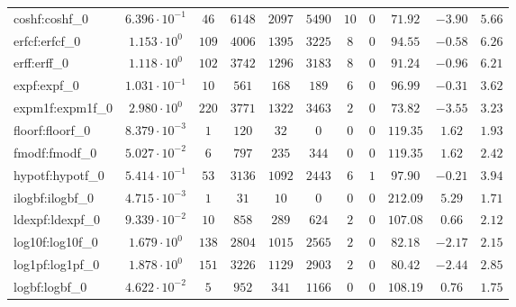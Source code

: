 \begin{tabular}{|l|c|c|c|c|c|c|c|c|c|c|}
coshf:coshf\_0               & $ 6.396 \cdot 10^{-1} $ & $ 46     $ & $ 6148   $ & $ 2097  $ & $ 5490  $ & $ 10  $ & $ 0 $ & $ 71.92       $ & $ -3.90   $ & $ 5.66    $ \\
erfcf:erfcf\_0               & $ 1.153 \cdot 10^{0}  $ & $ 109    $ & $ 4006   $ & $ 1395  $ & $ 3225  $ & $ 8   $ & $ 0 $ & $ 94.55       $ & $ -0.58   $ & $ 6.26    $ \\
erff:erff\_0                 & $ 1.118 \cdot 10^{0}  $ & $ 102    $ & $ 3742   $ & $ 1296  $ & $ 3183  $ & $ 8   $ & $ 0 $ & $ 91.24       $ & $ -0.96   $ & $ 6.21    $ \\
expf:expf\_0                 & $ 1.031 \cdot 10^{-1} $ & $ 10     $ & $ 561    $ & $ 168   $ & $ 189   $ & $ 6   $ & $ 0 $ & $ 96.99       $ & $ -0.31   $ & $ 3.62    $ \\
expm1f:expm1f\_0             & $ 2.980 \cdot 10^{0}  $ & $ 220    $ & $ 3771   $ & $ 1322  $ & $ 3463  $ & $ 2   $ & $ 0 $ & $ 73.82       $ & $ -3.55   $ & $ 3.23    $ \\
floorf:floorf\_0             & $ 8.379 \cdot 10^{-3} $ & $ 1      $ & $ 120    $ & $ 32    $ & $ 0     $ & $ 0   $ & $ 0 $ & $ 119.35      $ & $ 1.62    $ & $ 1.93    $ \\
fmodf:fmodf\_0               & $ 5.027 \cdot 10^{-2} $ & $ 6      $ & $ 797    $ & $ 235   $ & $ 344   $ & $ 0   $ & $ 0 $ & $ 119.35      $ & $ 1.62    $ & $ 2.42    $ \\
hypotf:hypotf\_0             & $ 5.414 \cdot 10^{-1} $ & $ 53     $ & $ 3136   $ & $ 1092  $ & $ 2443  $ & $ 6   $ & $ 1 $ & $ 97.90       $ & $ -0.21   $ & $ 3.94    $ \\
ilogbf:ilogbf\_0             & $ 4.715 \cdot 10^{-3} $ & $ 1      $ & $ 31     $ & $ 10    $ & $ 0     $ & $ 0   $ & $ 0 $ & $ 212.09      $ & $ 5.29    $ & $ 1.71    $ \\
ldexpf:ldexpf\_0             & $ 9.339 \cdot 10^{-2} $ & $ 10     $ & $ 858    $ & $ 289   $ & $ 624   $ & $ 2   $ & $ 0 $ & $ 107.08      $ & $ 0.66    $ & $ 2.12    $ \\
log10f:log10f\_0             & $ 1.679 \cdot 10^{0}  $ & $ 138    $ & $ 2804   $ & $ 1015  $ & $ 2565  $ & $ 2   $ & $ 0 $ & $ 82.18       $ & $ -2.17   $ & $ 2.15    $ \\
log1pf:log1pf\_0             & $ 1.878 \cdot 10^{0}  $ & $ 151    $ & $ 3226   $ & $ 1129  $ & $ 2903  $ & $ 2   $ & $ 0 $ & $ 80.42       $ & $ -2.44   $ & $ 2.85    $ \\
logbf:logbf\_0               & $ 4.622 \cdot 10^{-2} $ & $ 5      $ & $ 952    $ & $ 341   $ & $ 1166  $ & $ 0   $ & $ 0 $ & $ 108.19      $ & $ 0.76    $ & $ 1.75    $ \\

\end{tabular}
